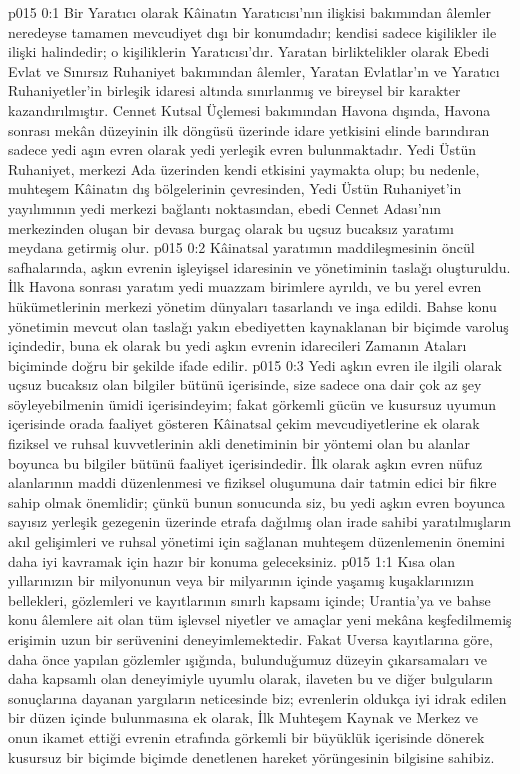 \vs p015 0:1 Bir Yaratıcı olarak Kâinatın Yaratıcısı’nın ilişkisi bakımından âlemler neredeyse tamamen mevcudiyet dışı bir konumdadır; kendisi sadece kişilikler ile ilişki halindedir; o kişiliklerin Yaratıcısı’dır. Yaratan birliktelikler olarak Ebedi Evlat ve Sınırsız Ruhaniyet bakımından âlemler, Yaratan Evlatlar’ın ve Yaratıcı Ruhaniyetler’in birleşik idaresi altında sınırlanmış ve bireysel bir karakter kazandırılmıştır. Cennet Kutsal Üçlemesi bakımından Havona dışında, Havona sonrası mekân düzeyinin ilk döngüsü üzerinde idare yetkisini elinde barındıran sadece yedi aşın evren olarak yedi yerleşik evren bulunmaktadır. Yedi Üstün Ruhaniyet, merkezi Ada üzerinden kendi etkisini yaymakta olup; bu nedenle, muhteşem Kâinatın dış bölgelerinin çevresinden, Yedi Üstün Ruhaniyet’in yayılımının yedi merkezi bağlantı noktasından, ebedi Cennet Adası’nın merkezinden oluşan bir devasa burgaç olarak bu uçsuz bucaksız yaratımı meydana getirmiş olur.
\vs p015 0:2 Kâinatsal yaratımın maddileşmesinin öncül safhalarında, aşkın evrenin işleyişsel idaresinin ve yönetiminin taslağı oluşturuldu. İlk Havona sonrası yaratım yedi muazzam birimlere ayrıldı, ve bu yerel evren hükümetlerinin merkezi yönetim dünyaları tasarlandı ve inşa edildi. Bahse konu yönetimin mevcut olan taslağı yakın ebediyetten kaynaklanan bir biçimde varoluş içindedir, buna ek olarak bu yedi aşkın evrenin idarecileri Zamanın Ataları biçiminde doğru bir şekilde ifade edilir.
\vs p015 0:3 Yedi aşkın evren ile ilgili olarak uçsuz bucaksız olan bilgiler bütünü içerisinde, size sadece ona dair çok az şey söyleyebilmenin ümidi içerisindeyim; fakat görkemli gücün ve kusursuz uyumun içerisinde orada faaliyet gösteren Kâinatsal çekim mevcudiyetlerine ek olarak fiziksel ve ruhsal kuvvetlerinin akli denetiminin bir yöntemi olan bu alanlar boyunca bu bilgiler bütünü faaliyet içerisindedir. İlk olarak aşkın evren nüfuz alanlarının maddi düzenlenmesi ve fiziksel oluşumuna dair tatmin edici bir fikre sahip olmak önemlidir; çünkü bunun sonucunda siz, bu yedi aşkın evren boyunca sayısız yerleşik gezegenin üzerinde etrafa dağılmış olan irade sahibi yaratılmışların akıl gelişimleri ve ruhsal yönetimi için sağlanan muhteşem düzenlemenin önemini daha iyi kavramak için hazır bir konuma geleceksiniz.
\vs p015 1:1 Kısa olan yıllarınızın bir milyonunun veya bir milyarının içinde yaşamış kuşaklarınızın bellekleri, gözlemleri ve kayıtlarının sınırlı kapsamı içinde; Urantia’ya ve bahse konu âlemlere ait olan tüm işlevsel niyetler ve amaçlar yeni mekâna keşfedilmemiş erişimin uzun bir serüvenini deneyimlemektedir. Fakat Uversa kayıtlarına göre, daha önce yapılan gözlemler ışığında, bulunduğumuz düzeyin çıkarsamaları ve daha kapsamlı olan deneyimiyle uyumlu olarak, ilaveten bu ve diğer bulguların sonuçlarına dayanan yargıların neticesinde biz; evrenlerin oldukça iyi idrak edilen bir düzen içinde bulunmasına ek olarak, İlk Muhteşem Kaynak ve Merkez ve onun ikamet ettiği evrenin etrafında görkemli bir büyüklük içerisinde dönerek kusursuz bir biçimde biçimde denetlenen hareket yörüngesinin bilgisine sahibiz.
